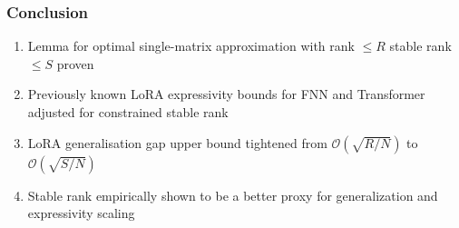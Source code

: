 \documentclass[10pt]{beamer}
\begin{document}
\begin{frame}
    \frametitle{Conclusion}
    \begin{enumerate}
        \item Lemma for optimal single-matrix approximation with rank $\leqslant R$ stable rank $\leqslant S$  proven
        \item Previously known LoRA expressivity bounds for FNN and Transformer adjusted for constrained stable rank 
        \item LoRA generalisation gap upper bound tightened from $\mathcal{O}(\sqrt{R/N})$ to $\mathcal{O}(\sqrt{S/N})$
        \item Stable rank empirically shown to be a better proxy for generalization and expressivity scaling
    \end{enumerate}
\end{frame}
\end{document}
